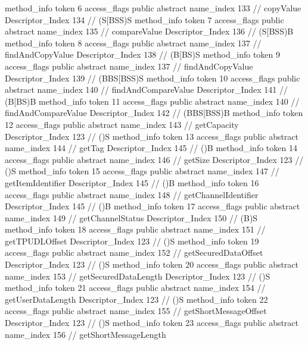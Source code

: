 {{{{{				}
				method_info {
					token	6
					access_flags	public abstract
					name_index	133		// copyValue
					Descriptor_Index	134		// (S[BSS)S
				}
				method_info {
					token	7
					access_flags	public abstract
					name_index	135		// compareValue
					Descriptor_Index	136		// (S[BSS)B
				}
				method_info {
					token	8
					access_flags	public abstract
					name_index	137		// findAndCopyValue
					Descriptor_Index	138		// (B[BS)S
				}
				method_info {
					token	9
					access_flags	public abstract
					name_index	137		// findAndCopyValue
					Descriptor_Index	139		// (BBS[BSS)S
				}
				method_info {
					token	10
					access_flags	public abstract
					name_index	140		// findAndCompareValue
					Descriptor_Index	141		// (B[BS)B
				}
				method_info {
					token	11
					access_flags	public abstract
					name_index	140		// findAndCompareValue
					Descriptor_Index	142		// (BBS[BSS)B
				}
				method_info {
					token	12
					access_flags	public abstract
					name_index	143		// getCapacity
					Descriptor_Index	123		// ()S
				}
				method_info {
					token	13
					access_flags	public abstract
					name_index	144		// getTag
					Descriptor_Index	145		// ()B
				}
				method_info {
					token	14
					access_flags	public abstract
					name_index	146		// getSize
					Descriptor_Index	123		// ()S
				}
				method_info {
					token	15
					access_flags	public abstract
					name_index	147		// getItemIdentifier
					Descriptor_Index	145		// ()B
				}
				method_info {
					token	16
					access_flags	public abstract
					name_index	148		// getChannelIdentifier
					Descriptor_Index	145		// ()B
				}
				method_info {
					token	17
					access_flags	public abstract
					name_index	149		// getChannelStatus
					Descriptor_Index	150		// (B)S
				}
				method_info {
					token	18
					access_flags	public abstract
					name_index	151		// getTPUDLOffset
					Descriptor_Index	123		// ()S
				}
				method_info {
					token	19
					access_flags	public abstract
					name_index	152		// getSecuredDataOffset
					Descriptor_Index	123		// ()S
				}
				method_info {
					token	20
					access_flags	public abstract
					name_index	153		// getSecuredDataLength
					Descriptor_Index	123		// ()S
				}
				method_info {
					token	21
					access_flags	public abstract
					name_index	154		// getUserDataLength
					Descriptor_Index	123		// ()S
				}
				method_info {
					token	22
					access_flags	public abstract
					name_index	155		// getShortMessageOffset
					Descriptor_Index	123		// ()S
				}
				method_info {
					token	23
					access_flags	public abstract
					name_index	156		// getShortMessageLength
}}}}}
